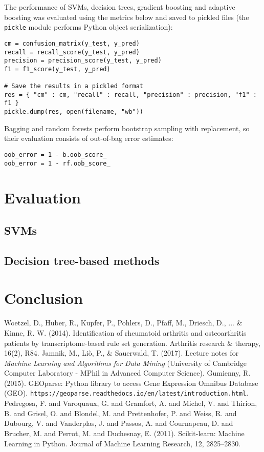 \documentclass[11pt]{article}
\numberwithin{equation}{section}
\begin{document}
The performance of SVMs, decision trees, gradient boosting and adaptive boosting was evaluated using the metrics below and saved to pickled files (the \texttt{pickle} module performs Python object serialization):
\begin{verbatim}
cm = confusion_matrix(y_test, y_pred)
recall = recall_score(y_test, y_pred)
precision = precision_score(y_test, y_pred)
f1 = f1_score(y_test, y_pred)

# Save the results in a pickled format
res = { "cm" : cm, "recall" : recall, "precision" : precision, "f1" : f1 }
pickle.dump(res, open(filename, "wb"))
\end{verbatim}

Bagging and random forests perform bootstrap sampling with replacement, so their evaluation consists of out-of-bag error estimates:
\begin{verbatim}
oob_error = 1 - b.oob_score_
oob_error = 1 - rf.oob_score_
\end{verbatim}

\section{Evaluation}

\subsection{SVMs}

\subsection{Decision tree-based methods}


\section{Conclusion}

\medskip
\begin{thebibliography}{9}
Woetzel, D., Huber, R., Kupfer, P., Pohlers, D., Pfaff, M., Driesch, D., ... \& Kinne, R. W. (2014). Identification of rheumatoid arthritis and osteoarthritis patients by transcriptome-based rule set generation. Arthritis research \& therapy, 16(2), R84.
Jamnik, M., Li\`o, P., \& Sauerwald, T. (2017). Lecture notes for \textit{Machine Learning and Algorithms for Data Mining} (University of Cambridge Computer Laboratory - MPhil in Advanced Computer Science).
Gumienny, R. (2015). GEOparse: Python library to access Gene Expression Omnibus Database (GEO). \texttt{https://geoparse.readthedocs.io/en/latest/introduction.html}.
Pedregosa, F. and Varoquaux, G. and Gramfort, A. and Michel, V. and Thirion, B. and Grisel, O. and Blondel, M. and Prettenhofer, P. and Weiss, R. and Dubourg, V. and Vanderplas, J. and Passos, A. and Cournapeau, D. and Brucher, M. and Perrot, M. and Duchesnay, E. (2011). Scikit-learn: Machine Learning in Python. Journal of Machine Learning Research, 12, 2825--2830.

\end{thebibliography}
\end{document}
